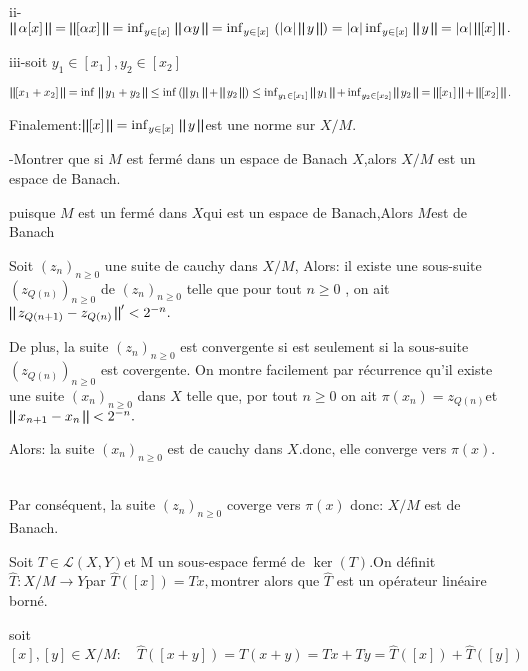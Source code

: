 \documentclass{article}
\begin{document}
ii-$\bigparallel \alpha [x] \bigparallel = \bigparallel [\alpha x]
\bigparallel = \inf_{y \in [x]} \text{{\textsc{}}} \bigparallel \alpha y
\bigparallel = \inf_{y \in [x]} \text{{\textsc{}}} \left( | \alpha |
\bigparallel y \bigparallel \right) = | \alpha | \inf_{y \in [x]}
\text{{\textsc{}}} \bigparallel y \bigparallel = | \alpha | \bigparallel [x]
\bigparallel .$

iii-soit $y_1 \in [x_1], y_2 \in [x_2]$

$\bigparallel [x_1 + x_2] \bigparallel = \inf  \text{{\textsc{}}} \bigparallel
y_1 + y_2 \bigparallel \leq \inf \left( \bigparallel y_1 \bigparallel +
\bigparallel y_2 \bigparallel \right) \leq \inf_{y_1 \in [x_1]} \bigparallel
y_1 \bigparallel + \inf_{y_2 \in [x_2]} \bigparallel y_2 \bigparallel =
\bigparallel [x_1] \bigparallel + \bigparallel [x_2] \bigparallel .$

Finalement:$\bigparallel [x] \bigparallel = \inf_{y \in [x]}
\text{{\textsc{}}} \bigparallel y \bigparallel$est une norme sur $X / M$.

-Montrer que si $M$ est ferm{\'e} dans un espace de Banach $X$,alors $X / M$
est un espace de Banach.

puisque $M$ est un ferm{\'e} dans $X$qui est un espace de Banach,Alors $M$est
de Banach

Soit $(z_n)_{n \geq 0}$ une suite de cauchy dans $X / M$, Alors: il existe une
sous-suite $(z_{Q (n)})_{n \geq 0}$ de $(z_n)_{n \geq 0}$ telle que pour tout
$n \geq 0$ , on ait $\bigparallel z_{Q (n + 1)} - z_{Q (n)} \bigparallel' <
2^{- n} .$

De plus, la suite $(z_n)_{n \geq 0}$ est convergente si est seulement si la
sous-suite $(z_{Q (n)})_{n \geq 0}$ est covergente. On montre facilement par
r{\'e}currence qu'il existe une suite $(x_n)_{n \geq 0}$ dans $X$ telle que,
por tout $n \geq 0$ on ait $\pi (x_n) = z_{Q (n)} $et $\bigparallel x_{n + 1}
- x_n \bigparallel < 2^{- n} .$

Alors: la suite $(x_n)_{n \geq 0}$ est de cauchy dans $X$.donc, elle converge
vers $\pi (x)$. \ \

Par cons{\'e}quent, la suite $(z_n)_{n \geq 0}$ coverge vers $\pi (x)$ donc:
$X / M$ est de Banach.

Soit $T \in \mathcal{L} (X, Y)$et M un sous-espace ferm{\'e} de $\ker (T) .$On
d{\'e}finit $\hat{T} : X / M \rightarrow Y$par $\hat{T} ([x]) = T x,$montrer
alors que $\hat{T}$ est un op{\'e}rateur lin{\'e}aire born{\'e}.

soit $[x], [y] \in X / M : \quad \hat{T} ([x + y]) = T (x + y) = T x + T y =
\hat{T} ([x]) + \hat{T} ([y])$
\end{document}
